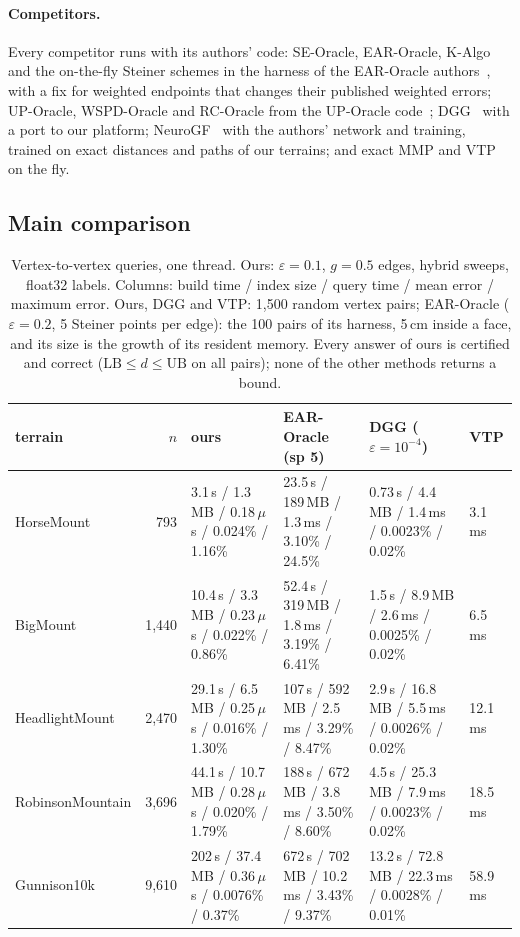 \documentclass[sigconf,nonacm,screen]{acmart}
\newcommand{\LB}{\mathrm{LB}}
\newcommand{\UB}{\mathrm{UB}}
\newcommand{\eps}{\varepsilon}
\begin{document}
\paragraph{Competitors.}
Every competitor runs with its authors' code: SE-Oracle, EAR-Oracle, K-Algo and the on-the-fly Steiner
schemes in the harness of the EAR-Oracle authors~\cite{huang2023ear}, with a fix for weighted endpoints that
changes their published weighted errors; UP-Oracle, WSPD-Oracle and RC-Oracle from the UP-Oracle
code~\cite{yan2025up}; DGG~\cite{adikusuma2020fast} with a port to our platform; NeuroGF~\cite{zhang2023neurogf}
with the authors' network and training, trained on exact distances and paths of our terrains; and exact MMP and
VTP on the fly.

\subsection{Main comparison}

\begin{table}[t]
\caption{Vertex-to-vertex queries, one thread. Ours: $\eps=0.1$, $g=0.5$ edges, hybrid sweeps, float32 labels.
Columns: build time / index size / query time / mean error / maximum error. Ours, DGG and VTP: 1,500 random vertex
pairs; EAR-Oracle ($\eps=0.2$, 5 Steiner points per edge): the 100 pairs of its harness, 5\,cm inside a face, and its
size is the growth of its resident memory. Every answer of ours is certified and correct ($\LB\le d\le\UB$ on all
pairs); none of the other methods returns a bound.}
\label{tab:main}
\small
\begin{tabular}{@{}lrllll@{}}
\toprule
terrain & $n$ & ours & EAR-Oracle (sp 5) & DGG ($\eps=10^{-4}$) & VTP\\
\midrule
HorseMount & 793 & 3.1\,s / 1.3\,MB / 0.18\,$\mu$s / 0.024\% / 1.16\% & 23.5\,s / 189\,MB / 1.3\,ms / 3.10\% / 24.5\% & 0.73\,s / 4.4\,MB / 1.4\,ms / 0.0023\% / 0.02\% & 3.1\,ms\\
BigMount & 1,440 & 10.4\,s / 3.3\,MB / 0.23\,$\mu$s / 0.022\% / 0.86\% & 52.4\,s / 319\,MB / 1.8\,ms / 3.19\% / 6.41\% & 1.5\,s / 8.9\,MB / 2.6\,ms / 0.0025\% / 0.02\% & 6.5\,ms\\
HeadlightMount & 2,470 & 29.1\,s / 6.5\,MB / 0.25\,$\mu$s / 0.016\% / 1.30\% & 107\,s / 592\,MB / 2.5\,ms / 3.29\% / 8.47\% & 2.9\,s / 16.8\,MB / 5.5\,ms / 0.0026\% / 0.02\% & 12.1\,ms\\
RobinsonMountain & 3,696 & 44.1\,s / 10.7\,MB / 0.28\,$\mu$s / 0.020\% / 1.79\% & 188\,s / 672\,MB / 3.8\,ms / 3.50\% / 8.60\% & 4.5\,s / 25.3\,MB / 7.9\,ms / 0.0023\% / 0.02\% & 18.5\,ms\\
Gunnison10k & 9,610 & 202\,s / 37.4\,MB / 0.36\,$\mu$s / 0.0076\% / 0.37\% & 672\,s / 702\,MB / 10.2\,ms / 3.43\% / 9.37\% & 13.2\,s / 72.8\,MB / 22.3\,ms / 0.0028\% / 0.01\% & 58.9\,ms\\
\bottomrule
\end{tabular}
\end{table}
\end{document}
